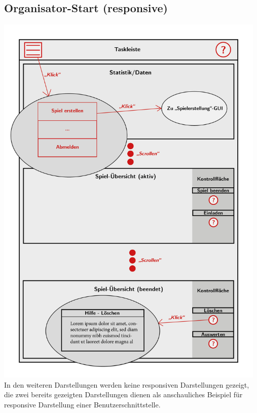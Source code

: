 \documentclass[a4paper]{scrreprt}
\begin{document}
    \subsection{Organisator-Start (responsive)}
    \centering
    \includegraphics[width=13cm]{../pictures/3_Organisator(responsive).jpg}\\
    In den weiteren Darstellungen werden keine responsiven Darstellungen gezeigt, die zwei bereits gezeigten Darstellungen dienen als anschauliches Beispiel für
    responsive Darstellung einer Benutzerschnittstelle.
\end{document}
